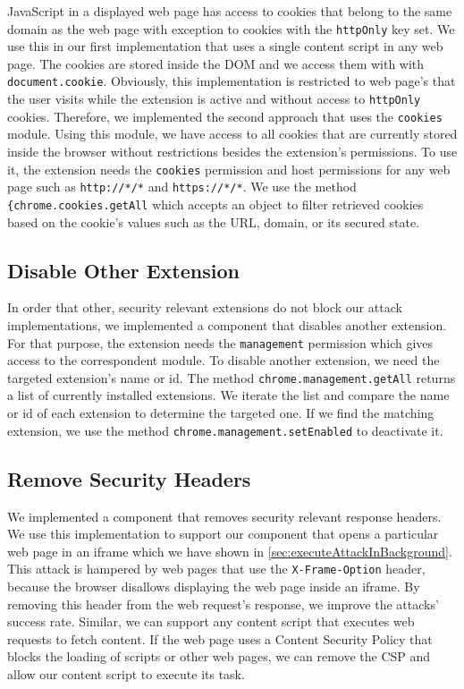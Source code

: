 	JavaScript in a displayed web page has access to cookies that belong to the same domain as the web page with exception to cookies with the \texttt{httpOnly} key set. We use this in our first implementation that uses a single content script in any web page. The cookies are stored inside the DOM and we access them with with \texttt{document.cookie}. Obviously, this implementation is restricted to web page's that the user visits while the extension is active and without access to \texttt{httpOnly} cookies. Therefore, we implemented the second approach that uses the \texttt{cookies} module. Using this module, we have access to all cookies that are currently stored inside the browser without restrictions besides the extension's permissions. To use it, the extension needs the \texttt{cookies} permission and host permissions for any web page such as \texttt{http://*/*} and \texttt{https://*/*}. We use the method \lstinline|{chrome.cookies.getAll| which accepts an object to filter retrieved cookies based on the cookie's values such as the URL, domain, or its secured state.

\subsection{Disable Other Extension}
\label{sec:disableOtherExtension}

	In order that other, security relevant extensions do not block our attack implementations, we implemented a component that disables another extension. For that purpose, the extension needs the \texttt{management} permission which gives access to the correspondent module. To disable another extension, we need the targeted extension's name or id.
	The method \lstinline|chrome.management.getAll| returns a list of currently installed extensions. We iterate the list and compare the name or id of each extension to determine the targeted one. If we find the matching extension, we use the method \lstinline|chrome.management.setEnabled| to deactivate it.

\subsection{Remove Security Headers}
\label{sec:removeSecurityHeaders}
	
	We implemented a component that removes security relevant response headers. We use this implementation to support our component that opens a particular web page in an iframe which we have shown in \autoref{sec:executeAttackInBackground}. This attack is hampered by web pages that use the \texttt{X-Frame-Option} header, because the browser disallows displaying the web page inside an iframe. By removing this header from the web request's response, we improve the attacks' success rate. Similar, we can support any content script that executes web requests to fetch content. If the web page uses a Content Security Policy that blocks the loading of scripts or other web pages, we can remove the CSP and allow our content script to execute its task.
	
